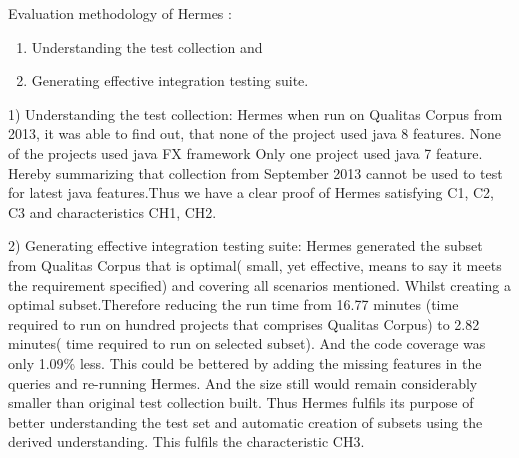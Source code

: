 \documentclass[authoryear,preprint]{sigplanconf}
\begin{document}
\begin{table*}[htbp]
	\centering
	\captionsetup{justification=centering}
	\caption{Characteristics available within each approach}
\label{tbl1}
\end{table*}

Evaluation methodology of Hermes : 
\begin{enumerate}
	\item Understanding the test collection and 
	\item Generating effective integration testing suite.
\end{enumerate}

1) Understanding the test collection:
Hermes when run on Qualitas Corpus from 2013, it was able to find out, that none of the project used java 8 features. None of the projects used java FX framework Only one project used java 7 feature. Hereby summarizing that collection from September 2013 cannot be used to test for latest java features.Thus we have a clear proof of Hermes satisfying C1, C2, C3 and characteristics CH1, CH2.

2) Generating effective integration testing suite:
Hermes generated the subset from Qualitas Corpus that is optimal( small, yet effective, means to say it meets the requirement specified) and covering all scenarios mentioned. Whilst creating a optimal subset.Therefore reducing the run time from 16.77 minutes (time required to run on hundred projects that comprises Qualitas Corpus) to 2.82 minutes( time required to run on selected subset). And the code coverage was only 1.09\% less. This could be bettered by adding the missing features in the queries and re-running Hermes. And the size still would remain considerably smaller than original test collection built. Thus Hermes fulfils its purpose of better understanding the test set and automatic creation of subsets using the derived understanding. This fulfils the characteristic CH3.
\end{document}
